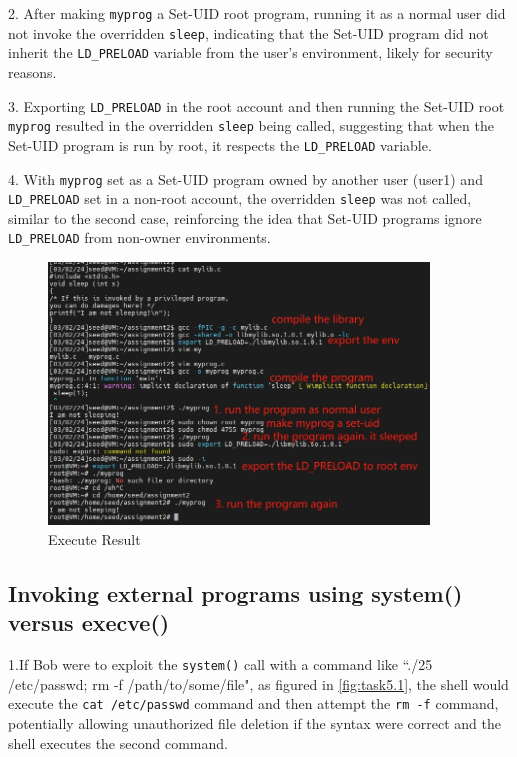 \documentclass[a4paper,11pt]{article}
\begin{document}
2. After making \verb|myprog| a Set-UID root program, running it as a normal user did not invoke the overridden \verb|sleep|, indicating that the Set-UID program did not inherit the \verb|LD_PRELOAD| variable from the user's environment, likely for security reasons.

3. Exporting \verb|LD_PRELOAD| in the root account and then running the Set-UID root \verb|myprog| resulted in the overridden \verb|sleep| being called, suggesting that when the Set-UID program is run by root, it respects the \verb|LD_PRELOAD| variable.

4. With \verb|myprog| set as a Set-UID program owned by another user (user1) and \verb|LD_PRELOAD| set in a non-root account, the overridden \verb|sleep| was not called, similar to the second case, reinforcing the idea that Set-UID programs ignore \verb|LD_PRELOAD| from non-owner environments.

\begin{figure}[h]
    \centering
       \includegraphics[width=0.9\textwidth]{figures/task4/task4.png}
    \caption{Execute Result}\label{fig:task4}
\end{figure}

\subsection{Invoking external programs using system() versus execve()}
1.If Bob were to exploit the \verb|system()| call with a command like ``./25 /etc/passwd; rm -f /path/to/some/file", as figured in \ref{fig:task5.1}, the shell would execute the \verb|cat /etc/passwd| command and then attempt the \verb|rm -f| command, potentially allowing unauthorized file deletion if the syntax were correct and the shell executes the second command.
\end{document}
